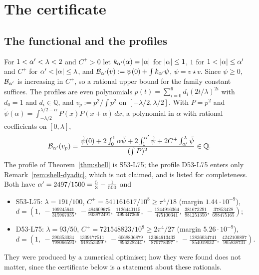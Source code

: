 \section{The certificate}\label{sec:cert}

\subsection{The functional and the profiles}
For $1<\alpha'<\lambda<2$ and $C^+>0$ let $k_{\alpha'}(\alpha)=\lvert \alpha\rvert$ for $\lvert \alpha\rvert\le1$, $1$ for $1<\lvert \alpha\rvert\le\alpha'$ and $C^+$ for $\alpha'<\lvert \alpha\rvert\le\lambda$, and
$\mathcal B_{\alpha'}(v):=\psi(0)+\int k_{\alpha'}\psi$, $\psi=v\star v$. Since $\psi\ge0$, $\mathcal B_{\alpha'}$ is increasing in $C^+$, so a rational upper bound for the family constant
suffices. The profiles are even polynomials $p(t)=\sum_{i=0}^6d_i(2t/\lambda)^{2i}$ with $d_0=1$ and $d_i\in\mathbb Q$, and $v_p:=p^2/\!\int p^2$ on $[-\lambda/2,\lambda/2]$.
With $P=p^2$ and $\tilde\psi(\alpha)=\int_{-\lambda/2}^{\lambda/2-\alpha}P(x)P(x+\alpha)\,dx$, a polynomial in $\alpha$ with rational coefficients on $[0,\lambda]$,
\[
\mathcal B_{\alpha'}(v_p)=\frac{\tilde\psi(0)+2\int_0^1\alpha\tilde\psi+2\int_1^{\alpha'}\tilde\psi+2C^+\int_{\alpha'}^{\lambda}\tilde\psi}{(\int P)^2}\in\mathbb Q .
\]
The profile of Theorem~\ref{thm:shell} is S53-L75; the profile D53-L75 enters only Remark~\ref{rem:shell-dyadic}, which is not claimed, and is listed for
completeness. Both have $\alpha'=2497/1500=\frac53-\frac1{500}$ and
\begin{itemize}
\item S53-L75: $\lambda=191/100$, $C^+=541161617/10^8\ge\pi^4/18$ (margin $1.44\cdot10^{-9}$),
$d=(1,\ -\tfrac{109245641}{315967035},\ -\tfrac{484609675}{903872491},\ \tfrac{1126440115}{499347366},\ -\tfrac{1244916364}{475100341},\ \tfrac{381673291}{981251350},\ \tfrac{37853428}{698475165})$;
\item D53-L75: $\lambda=93/50$, $C^+=721548823/10^8\ge2\pi^4/27$ (margin $5.26\cdot10^{-9}$),
$d=(1,\ -\tfrac{390353034}{798066593},\ \tfrac{1309177511}{918253499},\ -\tfrac{6068806879}{896328244},\ \tfrac{13364613432}{870778397},\ -\tfrac{12836034741}{854019032},\ \tfrac{4242100897}{905838731})$.
\end{itemize}
They were produced by a numerical optimiser; how they were found does not matter, since the certificate below is a statement about these
rationals.

